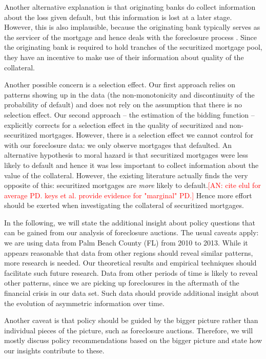 \documentclass[11pt,twopage]{article}
\newcommand{\AN}[1]{\textcolor{red}{[AN: #1]}}
\begin{document}
Another alternative explanation is that originating banks do collect
information about the loss given default, but this information is lost
at a later stage. However, this is also implausible, because the originating bank
typically serves as the servicer of the mortgage and hence deals with the
foreclosure process \cite[see e.g.][]{cetorelli2012role}. Since the originating bank is required to hold
tranches of the securitized mortgage pool, they have an incentive to
make use of their information about quality of the collateral.

Another possible concern is a selection effect. Our first approach relies
on patterns showing up in the data (the non-monotonicity and discontinuity
of the probability of default) and does not rely on the assumption that
there is no selection effect. Our second approach -- the estimation of
the bidding function -- explicitly corrects for a selection effect in the
quality of securitized and non-securitized mortgages. However, there is a
selection effect we cannot control for with our foreclosure data: we only
observe mortgages that defaulted. An alternative hypothesis to moral hazard is
that securitized mortgages were less likely to default and hence it was less important to
collect information about the value of the collateral. However, the existing
literature actually finds the very opposite of this: securitized mortgages
are \emph{more} likely to default.\AN{cite elul for average PD. keys et al. 
provide evidence for "marginal" PD.} Hence more effort should be exerted
when investigating the collateral of securitized mortgages.

In the following, we will state the additional insight about policy questions
that can be gained from our analysis of foreclosure auctions. The usual
caveats apply: we are using data from Palm Beach County (FL) from 2010 to
2013. While it appears 
reasonable that data from other regions should reveal similar patterns,
more research is needed. Our theoretical results and empirical techniques
should facilitate such future research. Data from other periods of time
is likely to reveal other patterns, since we are picking up foreclosures
in the aftermath of the financial crisis in our data set. Such data should
provide additional insight about the evolution of asymmetric information
over time.

Another caveat is that policy should be guided by the bigger picture rather
than individual pieces of the picture, such as foreclosure auctions. Therefore,
we will mostly discuss policy recommendations based on the bigger picture
and state how our insights contribute to these.
\end{document}
